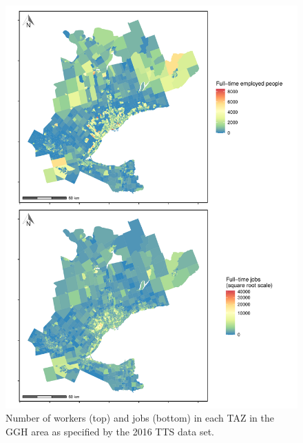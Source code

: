 \documentclass[Royal,times,sageh]{sagej}
\begin{document}
\begin{figure}
\includegraphics[width=1\linewidth]{Manuscript-Data-Package_files/figure-latex/tts-workers-jobs-plot-1} \caption{\label{fig:tts-workers-jobs-plot}Number of workers (top) and jobs (bottom) in each TAZ in the GGH area as specified by the 2016 TTS data set.}\label{fig:tts-workers-jobs-plot}
\end{figure}
\end{document}
